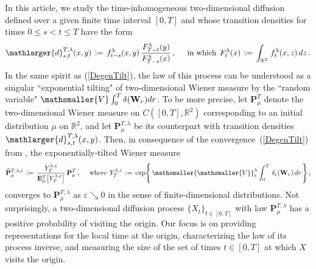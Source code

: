 \documentclass[10pt]{article}
\numberwithin{equation}{section}
\theoremstyle{definition}
\newcommand{\R}{{\mathbb R}}
\newcommand{\vsm}{{\mathsmaller{\mathsmaller{V}}}}
\begin{document}
In this article, we study the  time-inhomogeneous two-dimensional diffusion defined over a given finite time interval $[0,T]$ and whose transition densities for times $0\leq s <t\leq T$ have the form
\begin{align}\label{FirstTrans}
\mathlarger{d}_{s,t}^{T,\lambda}(x,y)\,:=\,f_{t-s}^{\lambda}(x,y)\,\frac{ F_{T-t}^{\lambda}(y) }{F_{T-s}^{\lambda}(x)  }\,,\hspace{.5cm}\text{in which} \hspace{.1cm}\,F_t^{\lambda}(x)\,:=\,\int_{\R^2}\, f_{t}^{\lambda}(x,z) \,dz\,.  
\end{align}
In the same spirit as (\ref{DegenTilt}), the law of this process can be understood as a singular ``exponential tilting" of two-dimensional Wiener measure by the ``random variable" $ \mathsmaller{V}\int_0^T \delta(\mathbf{W}_r)dr $.  To be more precise, let  $\mathbf{P}_{\mu}^T$ denote the two-dimensional Wiener measure on $C([0,T],\R^2)$ corresponding to an initial distribution $\mu $ on $\R^2$, and let $\mathbf{P}_{\mu}^{T,\lambda}$ be its counterpart with transition densities $\mathlarger{d}_{s,t}^{T,\lambda}(x,y)$. Then, in consequence of the convergence~(\ref{DegenTilt}) from \cite[Thm.\ 1]{Chen}, the exponentially-tilted Wiener measure $$  \widetilde{\mathbf{P}}_{\mu}^{T,\lambda,\varepsilon}\,:=\, \frac{  Y^{\lambda,\varepsilon}_T  }{  \mathbf{E}_{\mu}^T\big[ Y^{\lambda,\varepsilon}_T\big]  }\, \mathbf{P}_{\mu}^T \,,\hspace{.5cm} \text{where} \hspace{.1cm}\, Y^{\lambda,\varepsilon}_T\,:=\,\textup{exp}\Bigg\{ \,\vsm^{\lambda}_{\varepsilon}\int_0^T \,\delta_{\varepsilon}(\mathbf{W}_r)\,dr\,\Bigg\}\,,$$
converges to $\mathbf{P}_{\mu}^{T,\lambda}$ as $\varepsilon\searrow 0$   in the sense of finite-dimensional  distributions. Not surprisingly, a two-dimensional diffusion process $\{X_t\}_{t\in [0,T]}$ with law  $\mathbf{P}_{\mu}^{T,\lambda}$ has a positive probability of visiting the origin. Our focus is on providing  representations for the local time at the origin, characterizing the law of its process inverse, and  measuring the size of the set of times $t\in [0,T]$ at which $X$ visits the origin.  
\end{document}
